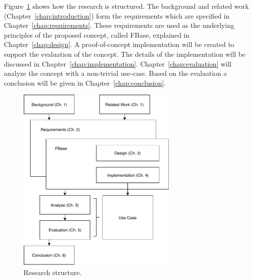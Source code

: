 
Figure~\ref{fig:reading-guide} shows how the research is structured. The background and related work (Chapter~\ref{chap:introduction}) form the requirements which are specified in Chapter~\ref{chap:requirements}. These requirements are used as the underlying principles of the proposed concept, called FBase, explained in Chapter~\ref{chap:design}. A proof-of-concept implementation will be created to support the evaluation of the concept. The details of the implementation will be discussed in Chapter~\ref{chap:implementation}. Chapter~\ref{chap:evaluation} will analyze the concept with a non-trivial use-case. Based on the evaluation a conclusion will be given in Chapter~\ref{chap:conclusion}. 


\vspace{0.1cm}

\begin{figure}[h]
	\centering
	\includegraphics[width=0.7\textwidth]{images/reading-guide.pdf}
	\caption{\label{fig:reading-guide} Research structure.}
\end{figure}

